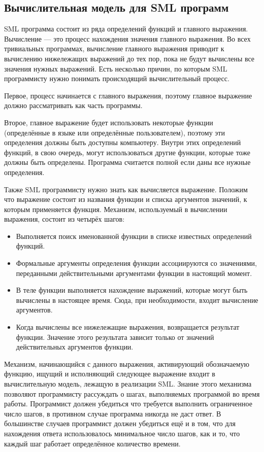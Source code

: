 \subsection{Вычислительная модель для SML программ}\label{ComputationalModelSMLPrograms}

SML программа состоит из ряда определений функций и главного выражения. Вычисление --- это процесс нахождения значения главного выражения. Во всех тривиальных программах, вычисление главного выражения приводит к вычислению нижележащих выражений до тех пор, пока не будут вычислены все значения нужных выражений. Есть несколько причин, по которым SML программисту нужно понимать происходящий вычислительный процесс.

Первое, процесс начинается с главного выражения, поэтому главное выражение должно рассматривать как часть программы.

Второе, главное выражение будет использовать некоторые функции (определённые в языке или определённые пользователем), поэтому эти определения должны быть доступны компьютеру. Внутри этих определений функций, в свою очередь, могут использоваться другие функции, которые тоже должны быть определены. Программа считается полной если даны все нужные определения.

Также SML программисту нужно знать как вычисляется выражение. Положим что выражение состоит из названия функции и списка аргументов значений, к которым применяется функция. Механизм, используемый в вычислении выражения, состоит из четырёх шагов:

\begin{itemize}
\item{Выполняется поиск именованной функции в списке известных определений функций.}

\item{Формальные аргументы определения функции ассоциируются со значениями, переданными действительными аргументами функции в настоящий момент.}

\item{В теле функции выполняется нахождение выражений, которые могут быть вычислены в настоящее время. Сюда, при необходимости, входит вычисление аргументов.}

\item{Когда вычислены все нижележащие выражения, возвращается результат функции. Значение этого результата зависит только от значений действительных аргументов функции.}
\end{itemize}

Механизм, начинающийся с данного выражения, активирующий обозначаемую функцию, ищущий и исполняющий следующее выражение входит в вычислительную модель, лежащую в реализации SML. Знание этого механизма позволяют программисту рассуждать о шагах, выполняемых программой во время работы. Программист должен убедиться что требуется выполнить ограниченное число шагов, в противном случае программа никогда не даст ответ. В большинстве случаев программист должен убедиться ещё и в том, что для нахождения ответа использовалось минимальное число шагов, как и то, что каждый шаг работает определённое количество времени.

